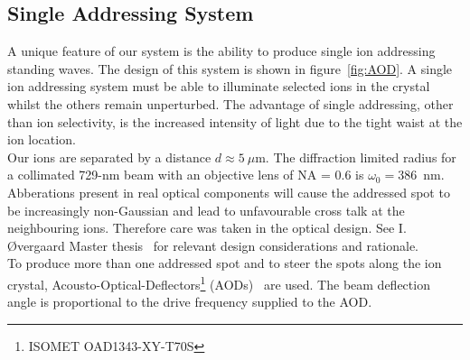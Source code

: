 \subsection{Single Addressing System}
\label{sec:Single Addressing System}
    A unique feature of our system is the ability to produce single ion addressing standing waves.
    The design of this system is shown in
    figure~\ref{fig:AOD}.  A single ion addressing system must be able to
    illuminate selected ions in the crystal whilst the others remain
    unperturbed. The advantage of single addressing, other than ion selectivity,
    is the increased intensity of light due to the tight waist at the ion
    location. \\
    Our ions are separated by a distance $d\approx 5~\mu$m.  The diffraction limited radius for a
    collimated 729-nm beam with an objective lens of NA = 0.6 is $\omega_0 = 386$~nm.  Abberations present in real optical
    components will cause the addressed spot to be increasingly non-Gaussian and
    lead to unfavourable cross talk at the neighbouring ions. Therefore care was
    taken in the optical design. See I. {\O}vergaard Master thesis~\cite{} for relevant design considerations and rationale.\\
    To produce more than one addressed spot and to steer the spots along the ion
    crystal, Acousto-Optical-Deflectors\footnote{ISOMET OAD1343-XY-T70S}
    (AODs)~\cite{nagourney_quantum_2014, li_low-crosstalk_2023,
    pogorelov_compact_2021} are used. The beam deflection angle is proportional to the
    drive frequency supplied to the AOD.  \\